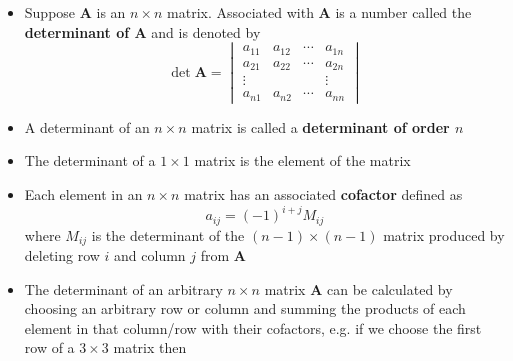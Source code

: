 \documentclass{article}
\begin{document}
\begin{itemize}
  \item Suppose $\mathbf{A}$ is an $n \times n$ matrix. Associated with $\mathbf{A}$ is a number called the \textbf{determinant of $\mathbf{A}$} and is denoted by \[\det \mathbf{A} = \begin{vmatrix}
            a_{11} & a_{12} & \cdots & a_{1n} \\
            a_{21} & a_{22} & \cdots & a_{2n} \\
            \vdots &        &        & \vdots \\
            a_{n1} & a_{n2} & \cdots & a_{nn}
          \end{vmatrix}\]

  \item A determinant of an $n \times n$ matrix is called a \textbf{determinant of order $n$}

  \item The determinant of a $1 \times 1$ matrix is the element of the matrix

  \item Each element in an $n \times n$ matrix has an associated \textbf{cofactor} defined as \[a_{ij} = (-1)^{i + j} M_{ij}\] where $M_{ij}$ is the determinant of the $(n - 1) \times (n - 1)$ matrix produced by deleting row $i$ and column $j$ from $\mathbf{A}$

  \item The determinant of an arbitrary $n \times n$ matrix $\mathbf{A}$ can be calculated by choosing an arbitrary row or column and summing the products of each element in that column/row with their cofactors, e.g. if we choose the first row of a $3 \times 3$ matrix then


\end{itemize}
\end{document}

